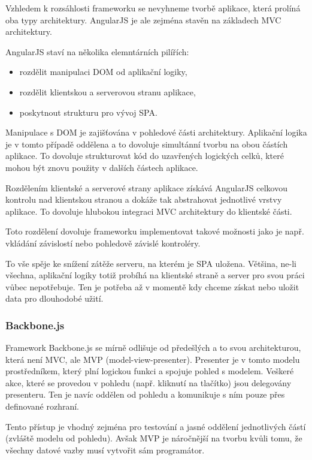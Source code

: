 Vzhledem k rozsáhlosti frameworku se nevyhneme tvorbě aplikace, která prolíná oba typy architektury. AngularJS je ale zejména stavěn na základech MVC architektury.

AngularJS staví na několika elemntárních pilířích:

\begin{itemize}
    \item rozdělit manipulaci DOM od aplikační logiky,
    \item rozdělit klientskou a serverovou stranu aplikace,
    \item poskytnout strukturu pro vývoj SPA.
\end{itemize}

Manipulace s DOM je zajišťována v pohledové části architektury. Aplikační logika je v tomto případě oddělena a to dovoluje simultánní tvorbu na obou částích aplikace. To dovoluje strukturovat kód do uzavřených logických celků, které mohou být znovu použity v dalších částech aplikace.

Rozdělením klientské a serverové strany aplikace získává AngularJS celkovou kontrolu nad klientskou stranou a dokáže tak abstrahovat jednotlivé vrstvy aplikace. To dovoluje hlubokou integraci MVC architektury do klientské části.

Toto rozdělení dovoluje frameworku implementovat takové možnosti jako je např. vkládání závislostí nebo pohledově závislé kontroléry.

To vše spěje ke snížení zátěže serveru, na kterém je SPA uložena. Většina, ne-li všechna, aplikační logiky totiž probíhá na klientské straně a server pro svou práci vůbec nepotřebuje. Ten je potřeba až v momentě kdy chceme získat nebo uložit data pro dlouhodobé užití.

\subsubsection*{Backbone.js}

Framework Backbone.js se mírně odlišuje od předešlých a to svou architekturou, která není MVC, ale MVP (model-view-presenter). Presenter je v tomto modelu prostředníkem, který plní logickou funkci a spojuje pohled s modelem. Veškeré akce, které se provedou v pohledu (např. kliknutí na tlačítko) jsou delegovány presenteru. Ten je navíc oddělen od pohledu a komunikuje s ním pouze přes definované rozhraní.

Tento přístup je vhodný zejména pro testování a jasné oddělení jednotlivých částí (zvláště modelu od pohledu). Avšak MVP je náročnější na tvorbu kvůli tomu, že všechny datové vazby musí vytvořit sám programátor.

